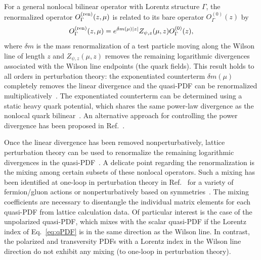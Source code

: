 \begin{itemize}
For a general nonlocal bilinear operator with Lorentz structure $\Gamma$, 
the renormalized operator $O_{\Gamma}^{\rm (ren)}(z,\mu)$ is related to its bare 
operator $O^{(0)}_{\Gamma}(z)$ by~\cite{Dotsenko:1979wb,Arefeva:1980zd, 
Craigie:1980qs,Stefanis:1983ke,Dorn:1986dt}
\begin{equation}\label{eq:renorm_non-local}
O_{\Gamma}^{\rm (ren)}(z,\mu)=e^{\delta m(\mu)|z|}Z_{\psi, z}(\mu,z)O^{(0)}_{\Gamma}(z),
\end{equation}
where $\delta m$ is the mass renormalization of a test particle moving along 
the Wilson line of length $z$ and $Z_{\psi, z}(\mu,z)$ removes the remaining 
logarithmic divergences associated with the Wilson line endpoints 
(the quark fields). 
%
This result holds to all orders in perturbation theory: the exponentiated 
counterterm $\delta m(\mu)$ completely removes the linear divergence and the 
quasi-PDF can be renormalized 
multiplicatively~\cite{Ji:2017oey,Ishikawa:2017faj}. 
%
The exponentiated counterterm can be determined using a static heavy quark 
potential, which shares the same power-law divergence as the nonlocal quark 
bilinear~\cite{Musch:2010ka,Ishikawa:2016znu,Chen:2016fxx,Green:2017xeu}. 
%
An alternative approach for controlling the power divergence has been proposed 
in Ref.~\cite{Monahan:2016bvm}.

Once the linear divergence has been removed nonperturbatively, lattice 
perturbation theory can be used to renormalize the remaining logarithmic
divergences in the quasi-PDF~\cite{Ishikawa:2016znu,Chen:2016fxx,
Carlson:2017gpk,Xiong:2017jtn}. 
%
A delicate point regarding the renormalization is the mixing among certain 
subsets of these nonlocal operators. 
%
Such a mixing has been identified at 
one-loop in perturbation theory in Ref.~\cite{Constantinou:2017sej} 
for a variety of fermion/gluon actions or nonperturbatively based on 
symmetries~\cite{Chen:2017mzz,Chen:2017mie}. 
%
The mixing coefficients are necessary to disentangle the individual matrix 
elements for each quasi-PDF from lattice calculation data. 
%
Of particular interest is the case of the unpolarized quasi-PDF, which mixes 
with the scalar quasi-PDF if the Lorentz index of Eq.~\eqref{eq:qPDF} is in the 
same direction as the Wilson line. 
%
In contrast, the polarized and transversity PDFs with a Lorentz index in the 
Wilson line direction do not exhibit any mixing (to one-loop in 
perturbation theory). 


\end{itemize}
